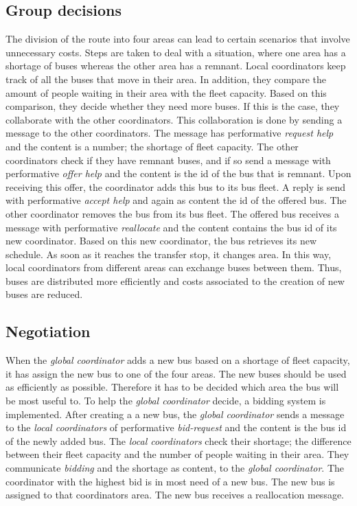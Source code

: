 \documentclass{article}
\begin{document}
\subsection{Group decisions}
The division of the route into four areas can lead to certain scenarios that involve unnecessary costs. Steps are taken to deal with a situation, where one area has a shortage of buses whereas the other area has a remnant. 
\newline
Local coordinators keep track of all the buses that move in their area. In addition, they compare the amount of people waiting in their area with the fleet capacity. Based on this comparison, they decide whether they need more buses. If this is the case, they collaborate with the other coordinators. 
\newline
This collaboration is done by sending a message to the other coordinators. The message has performative \textit{request help} and the content is a number; the shortage of fleet capacity. The other coordinators check if they have remnant buses, and if so send a message with performative \textit{offer help} and the content is the id of the bus that is remnant. Upon receiving this offer, the coordinator adds this bus to its bus fleet. A reply is send with performative \textit{accept help} and again as content the id of the offered bus. The other coordinator removes the bus from its bus fleet. The offered bus receives a message with performative \textit{reallocate} and the content contains the bus id of its new coordinator. Based on this new coordinator, the bus retrieves its new schedule. As soon as it reaches the transfer stop, it changes area. In this way, local coordinators from different areas can exchange buses between them. Thus, buses are distributed more efficiently and costs associated to the creation of new buses are reduced.

\subsection{Negotiation}
When the \textit{global coordinator} adds a new bus based on a shortage of fleet capacity, it has assign the new bus to one of the four areas. The new buses should be used as efficiently as possible. Therefore it has to be decided which area the bus will be most useful to. To help the \textit{global coordinator} decide, a bidding system is implemented. 
\newline
After creating a a new bus, the \textit{global coordinator} sends a message to the \textit{local coordinators} of performative \textit{bid-request} and the content is the bus id of the newly added bus. The \textit{local coordinators} check their shortage; the difference between their fleet capacity and the number of people waiting in their area. They communicate \textit{bidding} and the shortage as content, to the \textit{global coordinator}. The coordinator with the highest bid is in most need of a new bus. The new bus is assigned to that coordinators area. The new bus receives a reallocation message.
\end{document}
